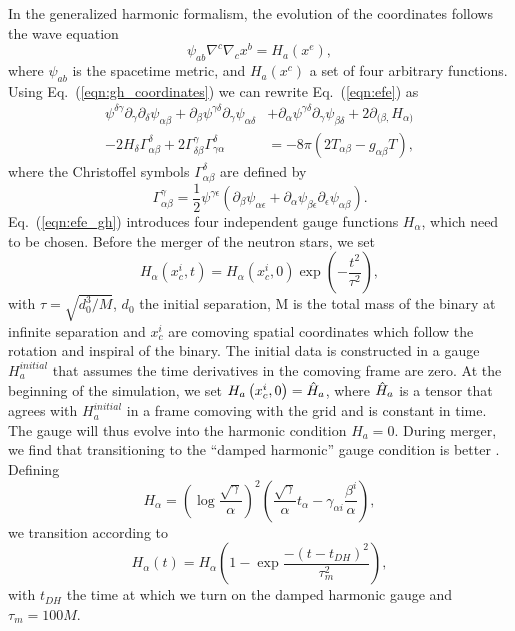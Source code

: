 In the generalized harmonic formalism, the evolution of the coordinates follows the wave equation
%
\begin{equation}
  \label{eqn:gh_coordinates}
  \psi_{ab}\nabla^c\nabla_cx^b = H_a\left(x^e\right),
\end{equation}
%
where $\psi_{ab}$ is the spacetime metric, and $H_a(x^c)$ a set of four arbitrary functions. Using Eq.~(\ref{eqn:gh_coordinates}) we can rewrite 
Eq.~(\ref{eqn:efe}) as \cite{pretorius2005numerical}
%
\begin{equation}
  \begin{split}
  \label{eqn:efe_gh}
  \psi^{\delta\gamma}\partial_\gamma\partial_\delta\psi_{\alpha\beta} + \partial_\beta\psi^{\gamma\delta}\partial_\gamma\psi_{\alpha\delta} &+ \partial_\alpha\psi^{\gamma\delta}\partial_\gamma\psi_{\beta\delta} + 2\partial_{(\beta,} H_{\alpha)} \\
  - 2H_\delta\Gamma^\delta_{\alpha\beta} + 2\Gamma^\gamma_{\delta\beta}\Gamma^{\delta}_{\gamma\alpha} &= -8\pi(2T_{\alpha\beta} - g_{\alpha\beta}T),
  \end{split}
\end{equation}
%
where the Christoffel symbols $\Gamma^\delta_{\alpha\beta}$ are defined by
%
\begin{equation}
\Gamma^\gamma_{\alpha\beta} = \frac{1}{2}\psi^{\gamma\epsilon}\left(\partial_\beta\psi_{\alpha\epsilon} + \partial_\alpha\psi_{\beta\epsilon} \partial_\epsilon\psi_{\alpha\beta}\right).
\end{equation}
%
Eq.~(\ref{eqn:efe_gh}) introduces four independent gauge functions $H_\alpha$, which need to be chosen. Before the merger of the neutron stars, we set
%
\begin{equation}
H_\alpha\left(x^i_c,t\right) = H_\alpha\left(x^i_c,0\right)\exp\left(-\frac{t^2}{\tau^2}\right),
\end{equation}
%
with $\tau = \sqrt{d^3_0/M}$, $d_0$ the initial separation, M is the total mass of the binary at infinite separation and $x^i_c$ are comoving spatial coordinates which follow the rotation and inspiral of the binary. The initial data is constructed in a gauge $H^{initial}_a$ that assumes the time derivatives in the comoving frame are zero. At the beginning of the simulation, we set $H_a\left(x^i_c,0\right) = \Hat H_a$, where $\Hat H_a$ is a tensor that agrees with $H^{initial}_a$ in a frame comoving with the grid and is constant in time. The gauge will thus evolve into the harmonic condition $H_a = 0$. During merger, we find that transitioning to the ``damped harmonic'' gauge condition is better \cite{szilagyi2014key}. Defining
%
\begin{equation}
  H_\alpha = \left(\log{\frac{\sqrt{\gamma}}{\alpha}}\right)^2\left(\frac{\sqrt{\gamma}}{\alpha}t_\alpha - \gamma_{\alpha i} \frac{\beta^i}{\alpha}\right),
\end{equation}
%
we transition according to
%
\begin{equation}
  H_\alpha(t) = H_\alpha\left(1-\exp{\frac{-(t-t_{DH})^2}{\tau_{m}^2}}\right),
\end{equation}
%
with $t_{DH}$ the time at which we turn on the damped harmonic gauge and $\tau_m = 100M$.

